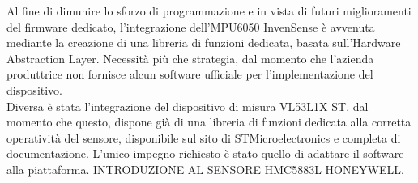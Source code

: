 Al fine di dimunire lo sforzo di programmazione e in vista di futuri miglioramenti del firmware dedicato, l'integrazione dell'MPU6050 InvenSense è avvenuta mediante la creazione di una libreria di funzioni dedicata, basata sull'Hardware Abstraction Layer. Necessità più che strategia, dal momento che l'azienda produttrice non fornisce alcun software ufficiale per l'implementazione del dispositivo.\\
Diversa è stata l'integrazione del dispositivo di misura VL53L1X ST, dal momento che questo, dispone già di una libreria di funzioni dedicata alla corretta operatività del sensore, disponibile sul sito di STMicroelectronics e completa di documentazione. 
L'unico impegno richiesto è stato quello di adattare il software alla piattaforma.
INTRODUZIONE AL SENSORE HMC5883L HONEYWELL. 